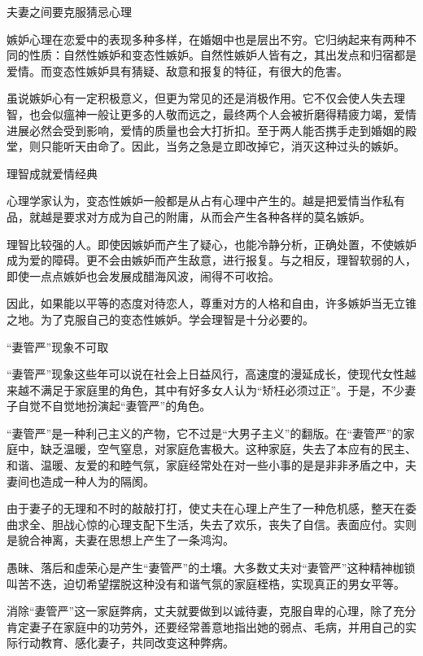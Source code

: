 \documentclass[12pt,UTF8]{ctexbook}
\begin{document}
夫妻之间要克服猜忌心理


嫉妒心理在恋爱中的表现多种多样，在婚姻中也是层出不穷。它归纳起来有两种不同的性质：自然性嫉妒和变态性嫉妒。自然性嫉妒人皆有之，其出发点和归宿都是爱情。而变态性嫉妒具有猜疑、敌意和报复的特征，有很大的危害。

虽说嫉妒心有一定积极意义，但更为常见的还是消极作用。它不仅会使人失去理智，也会似瘟神一般让更多的人敬而远之，最终两个人会被折磨得精疲力竭，爱情进展必然会受到影响，爱情的质量也会大打折扣。至于两人能否携手走到婚姻的殿堂，则只能听天由命了。因此，当务之急是立即改掉它，消灭这种过头的嫉妒。





理智成就爱情经典


心理学家认为，变态性嫉妒一般都是从占有心理中产生的。越是把爱情当作私有品，就越是要求对方成为自己的附庸，从而会产生各种各样的莫名嫉妒。

理智比较强的人。即使因嫉妒而产生了疑心，也能冷静分析，正确处置，不使嫉妒成为爱的障碍。更不会由嫉妒而产生敌意，进行报复。与之相反，理智软弱的人，即使一点点嫉妒也会发展成醋海风波，闹得不可收拾。

因此，如果能以平等的态度对待恋人，尊重对方的人格和自由，许多嫉妒当无立锥之地。为了克服自己的变态性嫉妒。学会理智是十分必要的。





“妻管严”现象不可取


“妻管严”现象这些年可以说在社会上日益风行，高速度的漫延成长，使现代女性越来越不满足于家庭里的角色，其中有好多女人认为“矫枉必须过正”。于是，不少妻子自觉不自觉地扮演起“妻管严”的角色。

“妻管严”是一种利己主义的产物，它不过是“大男子主义”的翻版。在“妻管严”的家庭中，缺乏温暖，空气窒息，对家庭危害极大。这种家庭，失去了本应有的民主、和谐、温暖、友爱的和睦气氛，家庭经常处在对一些小事的是是非非矛盾之中，夫妻间也造成一种人为的隔阂。

由于妻子的无理和不时的敲敲打打，使丈夫在心理上产生了一种危机感，整天在委曲求全、胆战心惊的心理支配下生活，失去了欢乐，丧失了自信。表面应付。实则是貌合神离，夫妻在思想上产生了一条鸿沟。

愚昧、落后和虚荣心是产生“妻管严”的土壤。大多数丈夫对“妻管严”这种精神枷锁叫苦不迭，迫切希望摆脱这种没有和谐气氛的家庭桎梏，实现真正的男女平等。

消除“妻管严”这一家庭弊病，丈夫就要做到以诚待妻，克服自卑的心理，除了充分肯定妻子在家庭中的功劳外，还要经常善意地指出她的弱点、毛病，并用自己的实际行动教育、感化妻子，共同改变这种弊病。
\end{document}
